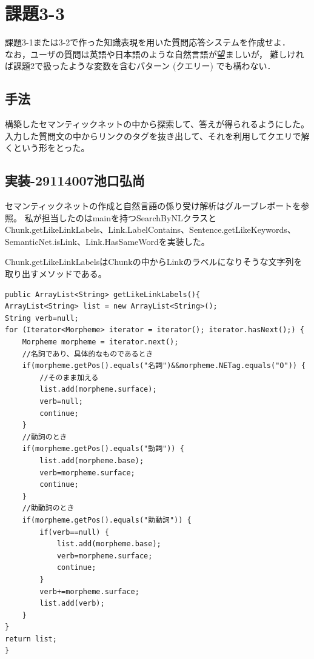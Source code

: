 \documentclass{jarticle}
\begin{document}
\section{課題3-3}
\begin{screen}
    課題3-1または3-2で作った知識表現を用いた質問応答システムを作成せよ．
    \\ なお，ユーザの質問は英語や日本語のような自然言語が望ましいが，
    難しければ課題2で扱ったような変数を含むパターン (クエリー) でも構わない． 
\end{screen}
\subsection{手法}
構築したセマンティックネットの中から探索して、答えが得られるようにした。
入力した質問文の中からリンクのタグを抜き出して、それを利用してクエリで解くという形をとった。

\subsection{実装-29114007池口弘尚}
セマンティックネットの作成と自然言語の係り受け解析はグループレポートを参照。
私が担当したのはmainを持つSearchByNLクラスとChunk.getLikeLinkLabels、Link.LabelContains、Sentence.getLikeKeywords、SemanticNet.isLink、Link.HasSameWordを実装した。

Chunk.getLikeLinkLabelsはChunkの中からLinkのラベルになりそうな文字列を取り出すメソッドである。

\begin{lstlisting}[caption=Chunk.getLikeLinkLabels,label=src:getLikeLinkLabels]
public ArrayList<String> getLikeLinkLabels(){
ArrayList<String> list = new ArrayList<String>();
String verb=null;
for (Iterator<Morpheme> iterator = iterator(); iterator.hasNext();) {
    Morpheme morpheme = iterator.next();
    //名詞であり、具体的なものであるとき
    if(morpheme.getPos().equals("名詞")&&morpheme.NETag.equals("O")) {
        //そのまま加える
        list.add(morpheme.surface);
        verb=null;
        continue;
    }
    //動詞のとき
    if(morpheme.getPos().equals("動詞")) {
        list.add(morpheme.base);
        verb=morpheme.surface;
        continue;
    }
    //助動詞のとき
    if(morpheme.getPos().equals("助動詞")) {
        if(verb==null) {
            list.add(morpheme.base);
            verb=morpheme.surface;
            continue;
        }
        verb+=morpheme.surface;
        list.add(verb);
    }
}
return list;
}
\end{lstlisting}
\end{document}
